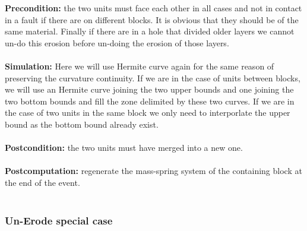 \documentclass[12pt, a4paper]{report} %
\begin{document}
\textbf{Precondition:} the two units must face each other in all cases and not in contact in a fault if there are on different blocks. It is obvious that they should be of the same material. Finally if there are in a hole that divided older layers we cannot un-do this erosion before un-doing the erosion of those layers.\\\\
\textbf{Simulation:} Here we will use Hermite curve again for the same reason of preserving the curvature continuity. If we are in the case of units between blocks, we will use an Hermite curve joining the two upper bounds and one joining the two bottom bounds and fill the zone delimited by these two curves. If we are in the case of two units in the same block we only need to interporlate the upper bound as the bottom bound already exist.\\\\
\textbf{Postcondition:} the two units must have merged into a new one.\\\\
\textbf{Postcomputation:} regenerate the mass-spring system of the containing block at the end of the event.\\\\
\subsubsection{Un-Erode special case}
\end{document}
